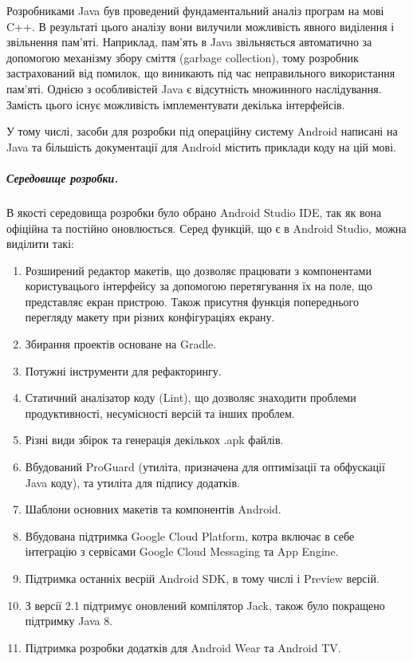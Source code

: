 \documentclass[../main.tex]{subfiles}
\begin{document}
Розробниками Java був проведений фундаментальний аналіз програм на мові C++. В результаті цього аналізу вони вилучили можливість явного виділення і звільнення пам'яті. Наприклад, пам'ять в Java звільняється автоматично за допомогою механізму збору сміття (garbage collection), тому розробник застрахований від помилок, що виникають під час неправильного використання пам'яті. Однією з особливістей Java є відсутність множинного наслідування. Замість цього існує можливість імплементувати декілька інтерфейсів.

У тому числі, засоби для розробки під операційну систему Android написані на Java та більшість документації для Android містить приклади коду на цій мові.

\subparagraph{Середовище розробки.}
В якості середовища розробки було обрано Android Studio IDE, так як вона офіційна та постійно оновлюється. Серед функцій, що є в Android Studio, можна виділити такі:

\begin{enumerate}
	\item Розширений редактор макетів, що дозволяє працювати з компонентами користувацього інтерфейсу за допомогою перетягування їх на поле, що представляє екран пристрою. Також присутня функція попереднього перегляду макету при різних конфігураціях екрану.
	\item Збирання проектів основане на Gradle.
	\item Потужні інструменти для рефакторингу.
	\item Статичний аналізатор коду (Lint), що дозволяє знаходити проблеми продуктивності, несумісності версій та інших проблем.
	\item Різні види збірок та генерація декількох .apk файлів.
	\item Вбудований ProGuard (утиліта, призначена для оптимізації та обфускації Java коду), та утиліта для підпису додатків.
	\item Шаблони основних макетів та компонентів Android.
	\item Вбудована підтримка Google Cloud Platform, котра включає в себе інтеграцію з сервісами Google Cloud Messaging та App Engine.
	\item Підтримка останніх весрій Android SDK, в тому числі і Preview версій.
	\item З версії 2.1 підтримує оновлений компілятор Jack, також було покращено підтримку Java 8.
	\item Підтримка розробки додатків для Android Wear та Android TV.
\end{enumerate}
\end{document}
